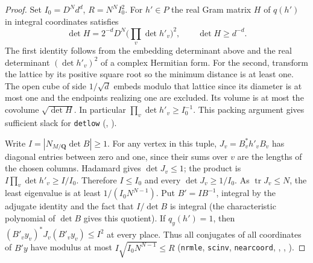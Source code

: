 \begin{proof}
Set $I_0=D^N d^d$, $R=N^N I_0^2$. For $h'\in P$ the real Gram matrix
$H$ of $q(h')$ in integral coordinates satisfies
\[
 \det H=2^{-d}D^N\Big(\prod_v\det h'_v\Big)^2,\qquad
 \det H\ge d^{-d}.
\]
The first identity follows from the embedding determinant above and the
real determinant $(\det h'_v)^2$ of a complex Hermitian form. For the
second, transform the lattice by its positive square root so the
minimum distance is at least one. The open cube of side $1/\sqrt d$
embeds modulo that lattice since its diameter is at most one and the
endpoints realizing one are excluded. Its volume is at most the
covolume $\sqrt{\det H}$. In particular $\prod_v\det h'_v\ge I_0^{-1}$.
This packing argument gives sufficient slack for \nolinkurl{detlow}
(, ).

Write $I=|N_{M/\mathbf Q}\det B|\ge1$. For any vertex in this tuple,
$J_v=B_v^* h'_v B_v$ has diagonal entries between zero and one, since
their sums over $v$ are the lengths of the chosen columns.
Hadamard gives $\det J_v\le1$; the product is
$I\prod_v\det h'_v\ge I/I_0$. Therefore $I\le I_0$ and every
$\det J_v\ge 1/I_0$. As $\operatorname{tr}J_v\le N$, the least
eigenvalue is at least $1/(I_0N^{N-1})$. Put $B'=IB^{-1}$, integral
by the adjugate identity and the fact that $I/\det B$ is integral
(the characteristic polynomial of $\det B$ gives this quotient).
If $q_y(h')=1$, then
$(B'_vy_v)^*J_v(B'_vy_v)\le I^2$ at every place. Thus all conjugates
of all coordinates of $B'y$ have modulus at most
$I\sqrt{I_0 N^{N-1}}\le R$
(\nolinkurl{nrmle}, \nolinkurl{scinv}, \nolinkurl{nearcoord},
,
, ).


\end{proof}
